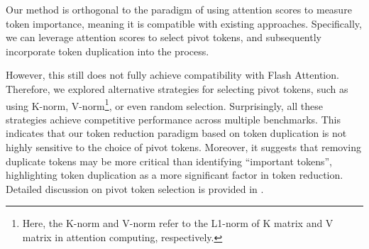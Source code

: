 Our method is orthogonal to the paradigm of using attention scores to measure token importance, meaning it is compatible with existing approaches. Specifically, we can leverage attention scores to select pivot tokens, and subsequently incorporate token duplication into the process.

However, this still does not fully achieve compatibility with Flash Attention. Therefore, we explored alternative strategies for selecting pivot tokens, such as using K-norm, V-norm\footnote{Here, the K-norm and V-norm refer to the L1-norm of K matrix and V matrix in attention computing, respectively.}, or even random selection. Surprisingly, all these strategies achieve competitive performance across multiple benchmarks. This indicates that our token reduction paradigm based on token duplication is not highly sensitive to the choice of pivot tokens. Moreover, it suggests that removing duplicate tokens may be more critical than identifying ``important tokens'', highlighting token duplication as a more significant factor in token reduction.
Detailed discussion on pivot token selection is provided in .

